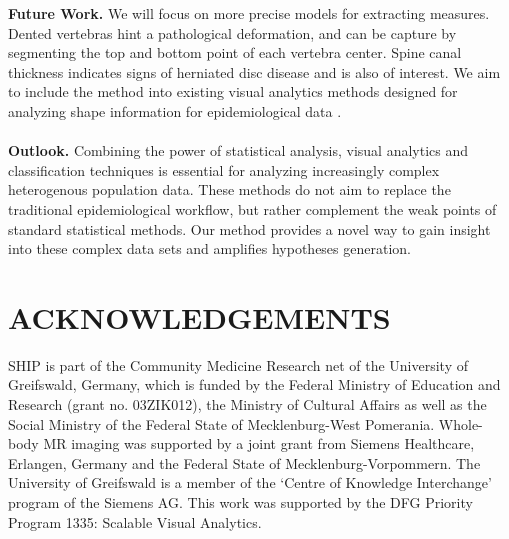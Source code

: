 \documentclass[a4paper,twoside]{style/article}
\begin{document}
\noindent \textbf{Future Work.}
We will focus on more precise models for extracting measures.
Dented vertebras hint a pathological deformation, and can be capture by segmenting the top and bottom point of each vertebra center.
Spine canal thickness indicates signs of herniated disc disease and is also of interest.
We aim to include the method into existing visual analytics methods designed for analyzing shape information for epidemiological data \cite{Klemm2014VIS}.
\\\\
\noindent \textbf{Outlook.}
Combining the power of statistical analysis, visual analytics and classification techniques is essential for analyzing increasingly complex heterogenous population data.
These methods do not aim to replace the traditional epidemiological workflow, but rather complement the weak points of standard statistical methods.
Our method provides a novel way to gain insight into these complex data sets and amplifies hypotheses generation.
\section*{\uppercase{Acknowledgements}}
\begin{small}
\noindent SHIP is part of the Community Medicine Research net of the University of Greifswald, Germany, which is funded by the Federal Ministry of Education and Research (grant no. 03ZIK012), the Ministry of Cultural Affairs as well as the Social Ministry of the Federal State of Mecklenburg-West Pomerania. Whole-body MR imaging was supported by a joint grant from Siemens Healthcare, Erlangen, Germany and the Federal State of Mecklenburg-Vorpommern. The University of Greifswald is a member of the ‘Centre of Knowledge Interchange’ program of the Siemens AG. This work was supported by the DFG Priority Program 1335: Scalable Visual Analytics.
\end{small}



{\small
}


\vfill
\end{document}

